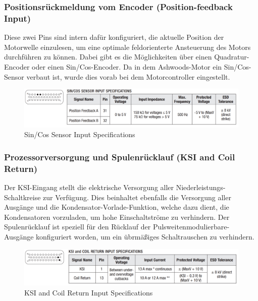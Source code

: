 \subsubsection{Positionsrückmeldung vom Encoder (Position-feedback Input)}
Diese zwei Pins sind intern dafür konfiguriert, die aktuelle Position der Motorwelle einzulesen, um eine optimale feldorienterte Ansteuerung des Motors durchführen zu können. Dabei gibt es die Möglichkeiten über einen Quadratur-Encoder oder einen Sin/Cos-Encoder. Da in dem Ashwoods-Motor ein Sin/Cos-Sensor verbaut ist, wurde dies vorab bei dem Motorcontroller eingestellt.

\begin{figure}[H]
	\begin{center}
		\includegraphics[scale=0.5]{figures/hcis/SinCosSensor_Input_Specifications.png}
		\caption{Sin/Cos Sensor Input Specifications}
	\end{center}
\end{figure}



\subsubsection{Prozessorversorgung und Spulenrücklauf (KSI and Coil Return)}
Der KSI-Eingang stellt die elektrische Versorgung aller Niederleistungs-Schaltkreise zur Verfügung. Dies  beinhaltet ebenfalls die Versorgung aller Ausgänge und die Kondensator-Vorlade-Funktion, welche dazu dient, die Kondensatoren vorzuladen, um hohe Einschaltströme zu verhindern. Der Spulenrücklauf ist speziell für den Rücklauf der Pulsweitenmodulierbare-Ausgänge konfiguriert worden, um ein übrmäßiges Schaltrauschen zu verhindern.

\begin{figure}[H]
	\begin{center}
		\includegraphics[scale=0.5]{figures/hcis/KSI_CoilReturn_Input_Specifications.png}
		\caption{KSI and Coil Return Input Specifications}
	\end{center}
\end{figure}



